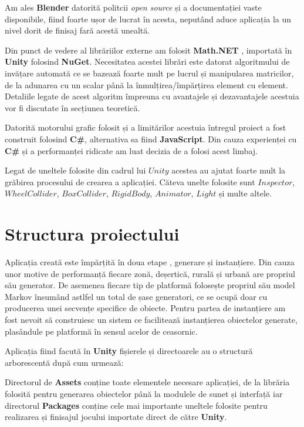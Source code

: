 Am ales \textbf{Blender} datorită politcii \textit{open source} și a documentației vaste disponibile, fiind foarte ușor de lucrat în acesta, neputând aduce aplicația la un nivel dorit de finisaj fară acestă unealtă.\par

Din punct de vedere al librăriilor externe am folosit \textbf{Math.NET} , importată în \textbf{Unity} folosind \textbf{NuGet}. Necesitatea acestei librări este datorat algoritmului de invățare automată ce se bazează foarte mult pe lucrul și manipularea matricilor, de la adunarea cu un scalar până la înmulțirea/împărțirea element cu element. Detaliile legate de acest algoritm împreuna cu avantajele și dezavantajele acestuia vor fi discutate în secțiunea teoretică.\par

Datorită motorului grafic folosit și a limitărilor acestuia întregul proiect a fost construit folosind \textbf{C\#}, alternativa sa fiind \textbf{JavaScript}. Din cauza experienței cu \textbf{C\#} și a performanței ridicate am luat decizia de a folosi acest limbaj.\par

Legat de uneltele folosite din cadrul lui $Unity$ acestea au ajutat foarte mult la grăbirea procesului de crearea a aplicației. Căteva unelte folosite sunt $Inspector$, $WheelCollider$, $BoxCollider$, $RigidBody$, $Animator$, $Light$ și multe altele.\par

\section{Structura proiectului}

Aplicația creată este împărțită în doua etape , generare și instanțiere. Din cauza unor motive de performanță fiecare zonă, deșertică, rurală și urbană are propriul său generator. De asemenea fiecare tip de platformă folosește propriul său model Markov însumând astlfel un total de șase generatori, ce se ocupă doar cu producerea unei secvențe specifice de obiecte. Pentru partea de instanțiere am fost nevoit să construiesc un sistem ce facilitează instanțierea obiectelor generate, plasândule pe platformă în sensul acelor de ceasornic.\par

Aplicația fiind facută în \textbf{Unity} fișierele și directoarele au o structură arborescentă după cum urmează: \par

\par
Directorul de \textbf{Assets} conține toate elementele necesare aplicației, de la librăria folosită pentru generarea obiectelor până la modulele de sunet și interfață iar directorul \textbf{Packages} conține cele mai importante uneltele folosite pentru realizarea și finisajul jocului importate direct de către \textbf{Unity}.\par

